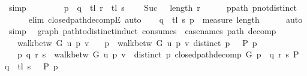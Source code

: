 \begin{isabellebody}
\ simp\isanewline
\ \ \isamarkupfalse%
\ \isamarkupfalse%
\isanewline
\ \ \ \ {\isachardoublequoteopen}p\ {\isacharequal}{\kern0pt}\ q\ {\isacharat}{\kern0pt}\ tl\ r\ {\isacharat}{\kern0pt}\ tl\ s{\isachardoublequoteclose}\isanewline
\ \ \ \ {\isachardoublequoteopen}Suc\ {}\ {\isacharless}{\kern0pt}\ length\ r{\isachardoublequoteclose}\isanewline
\ \ \ \ \isamarkupfalse%
\ p{\isacharunderscore}{\kern0pt}path\ p{\isacharunderscore}{\kern0pt}not{\isacharunderscore}{\kern0pt}distinct\isanewline
\ \ \ \ \isamarkupfalse%
\ {\isacharparenleft}{\kern0pt}elim\ closed{\isacharunderscore}{\kern0pt}path{\isacharunderscore}{\kern0pt}decompE{\isacharunderscore}{\kern0pt}{}{\isacharparenright}{\kern0pt}\ auto\isanewline
\ \ \isamarkupfalse%
\ {\isachardoublequoteopen}{\isacharparenleft}{\kern0pt}q\ {\isacharat}{\kern0pt}\ tl\ s{\isacharcomma}{\kern0pt}\ p{\isacharparenright}{\kern0pt}\ {\isasymin}\ measure\ length{\isachardoublequoteclose}\isanewline
\ \ \ \ \isamarkupfalse%
\ auto\isanewline
{}\isamarkupfalse%
\ simp%
\endisatagproof
{\isafoldproof}%
%
\isadelimproof
\isanewline
%
\endisadelimproof
%
\isadeliminvisible
\isanewline
%
\endisadeliminvisible
%
\isataginvisible
{}\isamarkupfalse%
\ {\isacharparenleft}{\kern0pt}\ graph{\isacharparenright}{\kern0pt}\ path{\isacharunderscore}{\kern0pt}to{\isacharunderscore}{\kern0pt}distinct{\isacharunderscore}{\kern0pt}induct\ {\isacharbrackleft}{\kern0pt}consumes\ {}{\isacharcomma}{\kern0pt}\ case{\isacharunderscore}{\kern0pt}names\ path\ decomp{\isacharbrackright}{\kern0pt}{\isacharcolon}{\kern0pt}\isanewline
\ \ \ {\isachardoublequoteopen}walk{\isacharunderscore}{\kern0pt}betw\ G\ u\ p\ v{\isachardoublequoteclose}\isanewline
\ \ \ {\isachardoublequoteopen}{\isasymAnd}p{\isachardot}{\kern0pt}\ {\isasymlbrakk}\ walk{\isacharunderscore}{\kern0pt}betw\ G\ u\ p\ v{\isacharsemicolon}{\kern0pt}\ distinct\ p\ {\isasymrbrakk}\ {\isasymLongrightarrow}\ P\ p{\isachardoublequoteclose}\isanewline
\ \ \ {\isachardoublequoteopen}{\isasymAnd}p\ q\ r\ s{\isachardot}{\kern0pt}\ {\isasymlbrakk}\ walk{\isacharunderscore}{\kern0pt}betw\ G\ u\ p\ v{\isacharsemicolon}{\kern0pt}\ {\isasymnot}\ distinct\ p{\isacharsemicolon}{\kern0pt}\ closed{\isacharunderscore}{\kern0pt}path{\isacharunderscore}{\kern0pt}decomp\ G\ p\ {\isacharequal}{\kern0pt}\ {\isacharparenleft}{\kern0pt}q{\isacharcomma}{\kern0pt}\ r{\isacharcomma}{\kern0pt}\ s{\isacharparenright}{\kern0pt}{\isacharsemicolon}{\kern0pt}\ P\ {\isacharparenleft}{\kern0pt}q\ {\isacharat}{\kern0pt}\ tl\ s{\isacharparenright}{\kern0pt}\ {\isasymrbrakk}\ {\isasymLongrightarrow}\ P\ p{\isachardoublequoteclose}\isanewline

\end{isabellebody}
